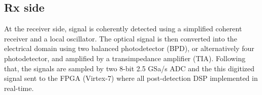\subsection{Rx side}
At the receiver side, signal is coherently detected using a simplified coherent receiver and a local oscillator. The optical signal is then converted into the electrical domain using two balanced photodetector (BPD), or alternatively four photodetector, and amplified by a transimpedance amplifier (TIA). Following that, the signals are sampled by two 8-bit 2.5 GSa/s ADC and the this digitized signal sent to the FPGA (Virtex-7) where all post-detection DSP implemented in real-time.

